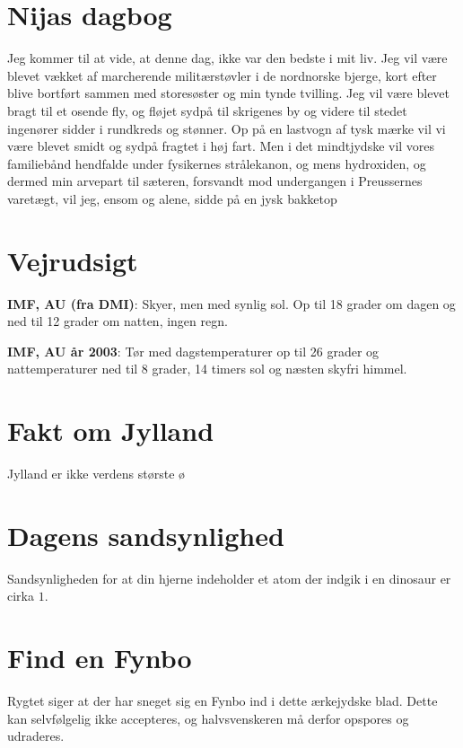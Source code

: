 

\begin{minipage}[b]{0.95\linewidth}
\begin{minipage}[t]{0.47\textwidth}
\vspace{1mm}
\section*{Nijas dagbog}
Jeg kommer til at vide, at denne dag, ikke var den bedste i mit liv. Jeg vil være blevet vækket af marcherende militærstøvler i de nordnorske bjerge, kort efter blive bortført sammen med storesøster og min tynde tvilling. Jeg vil være blevet bragt til et osende fly, og fløjet sydpå til skrigenes by og videre til stedet ingenører sidder i rundkreds og stønner. Op på en lastvogn af tysk mærke vil vi være blevet smidt og sydpå fragtet i høj fart. Men i det mindtjydske vil vores familiebånd hendfalde under fysikernes strålekanon, og mens hydroxiden, og dermed min arvepart til sæteren, forsvandt mod undergangen i Preussernes varetægt, vil jeg, ensom og alene, sidde på en jysk bakketop


\end{minipage}%
\hfill\begin{minipage}[t]{0.47\textwidth}
\vspace{1mm}
\section*{Vejrudsigt}
\textbf{IMF, AU (fra DMI)}: Skyer, men med synlig sol. Op til 18 grader om dagen og ned til 12 grader om natten, ingen regn.

\textbf{IMF, AU år 2003}: Tør med dagstemperaturer op til 26 grader og nattemperaturer ned til 8 grader, 14 timers sol og næsten skyfri himmel.

\section*{Fakt om Jylland}
Jylland er ikke verdens største ø

\section*{Dagens sandsynlighed}
Sandsynligheden for at din hjerne indeholder et atom der indgik i en dinosaur er cirka $1$.

\section*{Find en Fynbo}
Rygtet siger at der har sneget sig en Fynbo ind i dette ærkejydske blad. Dette kan selvfølgelig ikke accepteres, og halvsvenskeren må derfor opspores og udraderes.


\end{minipage}
\end{minipage}
